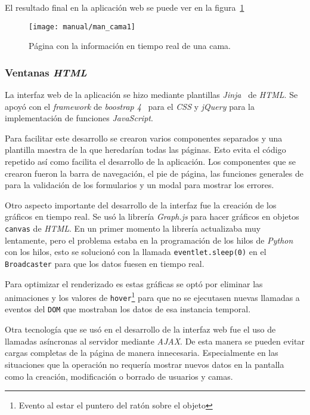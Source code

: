 El resultado final en la aplicación web se puede ver en la figura~\ref{fig:man_bed}

\begin{figure}
	\centering
	\texttt{[image: manual/man\_cama1]}
	\caption{Página con la información en tiempo real de una cama.}
	\label{fig:man_bed}
\end{figure}


\subsubsection{Ventanas \textit{HTML}}

La interfaz web de la aplicación se hizo mediante plantillas \textit{Jinja}~\cite{tool:jinja} de \textit{HTML}. Se apoyó con el \textit{framework} de \textit{boostrap 4}~\cite{wiki:boostrap} para el \textit{CSS} y \textit{jQuery} para la implementación de funciones \textit{JavaScript}.

Para facilitar este desarrollo se crearon varios componentes separados y una plantilla maestra de la que heredarían todas las páginas. Esto evita el código repetido así como facilita el desarrollo de la aplicación. Los componentes que se crearon fueron la barra de navegación, el pie de página, las funciones generales de para la validación de los formularios y un modal para mostrar los errores.

Otro aspecto importante del desarrollo de la interfaz fue la creación de los gráficos en tiempo real. Se usó la librería \textit{Graph.js} para hacer gráficos en objetos \texttt{canvas} de \textit{HTML}. En un primer momento la librería actualizaba muy lentamente, pero el problema estaba en la programación de los hilos de \textit{Python} con los hilos, esto se solucionó con la llamada \texttt{eventlet.sleep(0)} en el \texttt{Broadcaster} para que los datos fuesen en tiempo real.

Para optimizar el renderizado es estas gráficas se optó por eliminar las animaciones y los valores de \texttt{hover}\footnote{Evento al estar el puntero del ratón sobre el objeto} para que no se ejecutasen nuevas llamadas a eventos del \texttt{DOM} que mostraban los datos de esa instancia temporal.

Otra tecnología que se usó en el desarrollo de la interfaz web fue el uso de llamadas asíncronas al servidor mediante \textit{AJAX}. De esta manera se pueden evitar cargas completas de la página de manera innecesaria. Especialmente en las situaciones que la operación no requería mostrar nuevos datos en la pantalla como la creación, modificación o borrado de usuarios y camas. 

